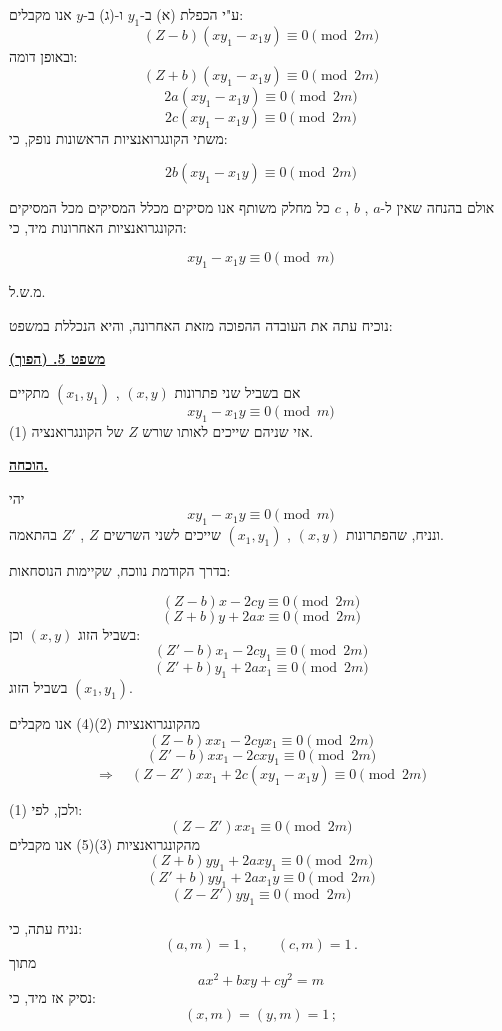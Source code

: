 \noindent ע"י הכפלת (א) ב-$y_1$ ו-(ג) ב-$y$ אנו מקבלים:
\[ (Z-b)(xy_1 - x_1y) \equiv 0 \pmod{2m} \]
\noindent ובאופן דומה:
\[ (Z+b)(xy_1 - x_1y) \equiv 0 \pmod{2m} \]
\[ 2a(xy_1 - x_1y) \equiv 0 \pmod{2m} \]
\[ 2c(xy_1 - x_1y) \equiv 0 \pmod{2m} \]
\noindent משתי הקונגרואנציות הראשונות נופק, כי:

\[ 2b(xy_1 - x_1y) \equiv 0 \pmod{2m} \]

\noindent אולם בהנחה שאין ל-$a$ , $b$ , $c$ כל מחלק משותף אנו מסיקים מכלל המסיקים מכל המסיקים הקונגרואנציות האחרונות מיד, כי:

\[ \boxed{ xy_1 - x_1y \equiv 0 \pmod{m} } \]

\medskip
\hfill מ.ש.ל.

\bigskip
\noindent נוכיח עתה את העובדה ההפוכה מזאת האחרונה, והיא הנכללת במשפט:

\bigskip
\noindent\textbf{\underline{משפט 5. (הפוך)}}

\noindent אם בשביל שני פתרונות $(x,y)$ , $(x_1,y_1)$ מתקיים
\[ xy_1 - x_1y \equiv 0 \pmod{m} \]
\noindent אזי שניהם שייכים לאותו שורש $Z$ של הקונגרואנציה (1).

\bigskip
\noindent\textbf{\underline{הוכחה.}}

\noindent יהי
\[ xy_1 - x_1y \equiv 0 \pmod{m} \tag{1} \]
\noindent ונניח, שהפתרונות $(x,y)$ , $(x_1,y_1)$ שייכים לשני השרשים $Z$ , $Z'$ בהתאמה.

\noindent בדרך הקודמת נווכח, שקיימות הנוסחאות:

\[ (Z-b)x - 2cy \equiv 0 \pmod{2m} \tag{2} \]
\[ (Z+b)y + 2ax \equiv 0 \pmod{2m} \tag{3} \]
\noindent בשביל הזוג $(x,y)$ וכן:
\[ (Z'-b)x_1 - 2cy_1 \equiv 0 \pmod{2m} \tag{4} \]
\[ (Z'+b)y_1 + 2ax_1 \equiv 0 \pmod{2m} \tag{5} \]
\noindent בשביל הזוג $(x_1,y_1)$.

\noindent מהקונגרואנציות (2)(4) אנו מקבלים
\[ (Z-b)xx_1 - 2cyx_1 \equiv 0 \pmod{2m} \]
\[ (Z'-b)xx_1 - 2cxy_1 \equiv 0 \pmod{2m} \]
\[ \Rightarrow \quad (Z-Z')xx_1 + 2c(xy_1 - x_1y) \equiv 0 \pmod{2m} \]

\noindent ולכן, לפי (1):
\[ (Z-Z')xx_1 \equiv 0 \pmod{2m} \tag{6} \]
\noindent מהקונגרואנציות (3)(5) אנו מקבלים
\[ (Z+b)yy_1 + 2axy_1 \equiv 0 \pmod{2m} \]
\[ (Z'+b)yy_1 + 2ax_1y \equiv 0 \pmod{2m} \]
\[ (Z-Z')yy_1 \equiv 0 \pmod{2m} \tag{7} \]

\noindent נניח עתה, כי:
\[ (a,m) = 1 \, , \qquad (c,m) = 1 \, . \]
\noindent מתוך
\[ ax^2 + bxy + cy^2 = m \]
\noindent נסיק אז מיד, כי:
\[ (x,m) = (y,m) = 1 \, ; \tag{8} \]

